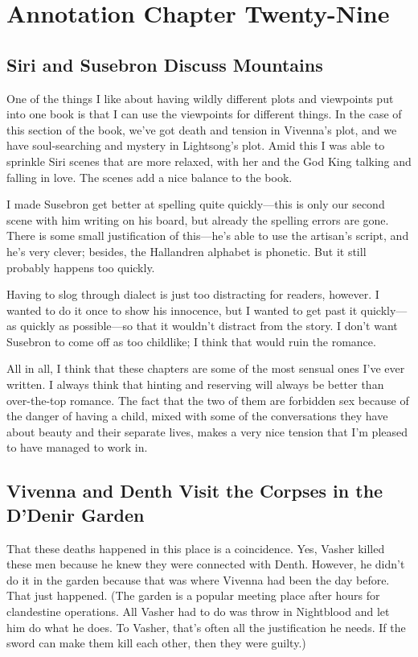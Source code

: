 \section{Annotation Chapter Twenty-Nine}

\subsection*{Siri and Susebron Discuss Mountains}

One of the things I like about having wildly different plots and viewpoints put into one book is that I can use the viewpoints for different things. In the case of this section of the book, we’ve got death and tension in Vivenna’s plot, and we have soul-searching and mystery in Lightsong’s plot. Amid this I was able to sprinkle Siri scenes that are more relaxed, with her and the God King talking and falling in love. The scenes add a nice balance to the book.

I made Susebron get better at spelling quite quickly—this is only our second scene with him writing on his board, but already the spelling errors are gone. There is some small justification of this—he’s able to use the artisan’s script, and he’s very clever; besides, the Hallandren alphabet is phonetic. But it still probably happens too quickly.

Having to slog through dialect is just too distracting for readers, however. I wanted to do it once to show his innocence, but I wanted to get past it quickly—as quickly as possible—so that it wouldn’t distract from the story. I don’t want Susebron to come off as too childlike; I think that would ruin the romance.

All in all, I think that these chapters are some of the most sensual ones I’ve ever written. I always think that hinting and reserving will always be better than over-the-top romance. The fact that the two of them are forbidden sex because of the danger of having a child, mixed with some of the conversations they have about beauty and their separate lives, makes a very nice tension that I’m pleased to have managed to work in.

\subsection*{Vivenna and Denth Visit the Corpses in the D’Denir Garden}

That these deaths happened in this place is a coincidence. Yes, Vasher killed these men because he knew they were connected with Denth. However, he didn’t do it in the garden because that was where Vivenna had been the day before. That just happened. (The garden is a popular meeting place after hours for clandestine operations. All Vasher had to do was throw in Nightblood and let him do what he does. To Vasher, that’s often all the justification he needs. If the sword can make them kill each other, then they were guilty.)

